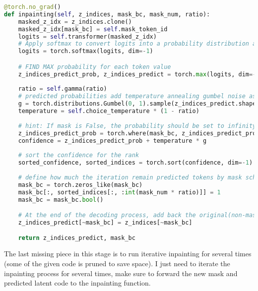 \begin{lstlisting}[language=Python, caption=models/VQGAN\_Transformer.py: MaskGit.inpainting]
@torch.no_grad()
def inpainting(self, z_indices, mask_bc, mask_num, ratio):
    masked_z_idx = z_indices.clone()
    masked_z_idx[mask_bc] = self.mask_token_id
    logits = self.transformer(masked_z_idx)
    # Apply softmax to convert logits into a probability distribution across the last dimension.
    logits = torch.softmax(logits, dim=-1)

    # FIND MAX probability for each token value
    z_indices_predict_prob, z_indices_predict = torch.max(logits, dim=-1)
    
    ratio = self.gamma(ratio)
    # predicted probabilities add temperature annealing gumbel noise as confidence
    g = torch.distributions.Gumbel(0, 1).sample(z_indices_predict.shape).to(z_indices_predict.device)  # gumbel noise
    temperature = self.choice_temperature * (1 - ratio)
    
    # hint: If mask is False, the probability should be set to infinity, so that the tokens are not affected by the transformer's prediction
    z_indices_predict_prob = torch.where(mask_bc, z_indices_predict_prob, torch.tensor(float('inf')))
    confidence = z_indices_predict_prob + temperature * g
    
    # sort the confidence for the rank
    sorted_confidence, sorted_indices = torch.sort(confidence, dim=-1)
    
    # define how much the iteration remain predicted tokens by mask scheduling
    mask_bc = torch.zeros_like(mask_bc)
    mask_bc[:, sorted_indices[:, :int(mask_num * ratio)]] = 1
    mask_bc = mask_bc.bool()

    # At the end of the decoding process, add back the original(non-masked) token values
    z_indices_predict[~mask_bc] = z_indices[~mask_bc]

    return z_indices_predict, mask_bc
\end{lstlisting}

The last missing piece in this stage is to run iterative inpainting for several times (some of the given code is pruned to save space).
I just need to iterate the inpainting process for several times, make sure to forward the new mask and predicted latent code to the inpainting function.

